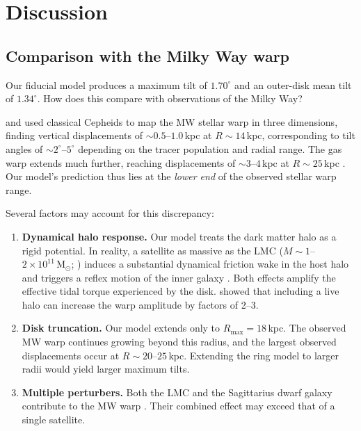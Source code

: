 \section{Discussion}
\label{sec:discussion}

\subsection{Comparison with the Milky Way warp}
\label{sec:comparison_mw}

Our fiducial model produces a maximum tilt of $1.70^\circ$ and an outer-disk mean tilt of $1.34^\circ$. How does this compare with observations of the Milky Way?

\citet{chen2019} and \citet{skowron2019} used classical Cepheids to map the MW stellar warp in three dimensions, finding vertical displacements of ${\sim}0.5$--$1.0$\,kpc at $R\sim14$\,kpc, corresponding to tilt angles of ${\sim}2^\circ$--$5^\circ$ depending on the tracer population and radial range. The  gas warp extends much further, reaching displacements of ${\sim}3$--$4$\,kpc at $R\sim25$\,kpc \citep[${\sim}10^\circ$;][]{bland2016}. Our model's prediction thus lies at the \emph{lower end} of the observed stellar warp range.

Several factors may account for this discrepancy:

\begin{enumerate}
    \item \textbf{Dynamical halo response.} Our model treats the dark matter halo as a rigid potential. In reality, a satellite as massive as the LMC ($M\sim1$--$2\times10^{11}\,\mathrm{M}_\odot$; \citealt{erkal2019}) induces a substantial dynamical friction wake in the host halo \citep{garavitocamargo2019} and triggers a reflex motion of the inner galaxy \citep{vasiliev2023}. Both effects amplify the effective tidal torque experienced by the disk. \citet{laporte2018} showed that including a live halo can increase the warp amplitude by factors of 2--3.
    
    \item \textbf{Disk truncation.} Our model extends only to $R_\mathrm{max}=18$\,kpc. The observed MW warp continues growing beyond this radius, and the largest observed displacements occur at $R\sim20$--$25$\,kpc. Extending the ring model to larger radii would yield larger maximum tilts.
    
    \item \textbf{Multiple perturbers.} Both the LMC and the Sagittarius dwarf galaxy contribute to the MW warp \citep{laporte2018, bennett2022}. Their combined effect may exceed that of a single satellite.
\end{enumerate}

